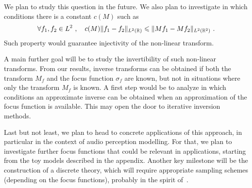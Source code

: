 We plan to study this question in the future.
%
We also plan to investigate in which conditions there is a constant $c(M)$ such as
\begin{equation}
    \forall f_1,f_2\in L^2\ ,\quad  c(M)\|f_1-f_2\|_{L^2(\R)} \leqslant\|Mf_1 - Mf_2 \|_{L^2(\R^2)}\ .
\end{equation}
Such property would guarantee injectivity of the non-linear transform.

\smallskip
A main further goal will be to study the invertibility of such non-linear transforms. From our results, inverse transforms can be obtained if both the transform $M_f$ and the focus function $\sigma_f$ are known, but not in situations where only the transform $M_f$ is known. A first step would be to analyze in which conditions an approximate inverse can be obtained when an approximation of the focus function is available. This may open the door to iterative inversion methods.

\smallskip
Last but not least, we plan to head to concrete applications of this approach, in particular in the context of audio perception modelling. For that, we plan to investigate further focus functions that could be relevant in applications, starting from the toy models described in the appendix. Another key milestone will be the construction of a discrete theory, which will require appropriate sampling schemes (depending on the focus functions), probably in the spirit of~\cite{Balazs2011theory,Doerfler2015nonstationary}.
